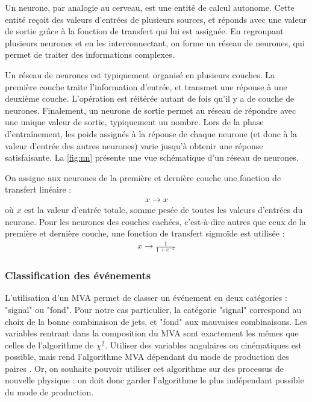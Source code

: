 Un neurone, par analogie au cerveau, est une entité de calcul autonome. Cette entité reçoit des valeurs d'entrées de plusieurs sources, et réponds avec une valeur de sortie grâce à la fonction de transfert qui lui est assignée. En regroupant plusieurs neurones et en les interconnectant, on forme un réseau de neurones, qui permet de traiter des informations complexes.

Un réseau de neurones est typiquement organisé en plusieurs couches. La première couche traite l'information d'entrée, et transmet une réponse à une deuxième couche. L'opération est réitérée autant de fois qu'il y a de couche de neurones. Finalement, un neurone de sortie permet au réseau de répondre avec une unique valeur de sortie, typiquement un nombre. Lors de la phase d'entraînement, les poids assignés à la réponse de chaque neurone (et donc à la valeur d'entrée des autres neurones) varie jusqu'à obtenir une réponse satisfaisante. La \cref{fig:nn} présente une vue schématique d'un réseau de neurones.

On assigne aux neurones de la première et dernière couche une fonction de transfert linéaire :
\begin{align*}
  x \rightarrow x
\end{align*}
où $x$ est la valeur d'entrée totale, somme pesée de toutes les valeurs d'entrées du neurone. Pour les neurones des couches cachées, c'est-à-dire autres que ceux de la première et dernière couche, une fonction de transfert sigmoïde est utilisée :
\begin{align*}
  x \rightarrow \frac{1}{1 + e^{-x}}
\end{align*}

\subsubsection{Classification des événements \ttbar}

L'utilisation d'un MVA permet de classer un événement en deux catégories : "signal" ou "fond". Pour notre cas particulier, la catégorie "signal" correspond au choix de la bonne combinaison de jets, et "fond" aux mauvaises combinaisons. Les variables rentrant dans la composition du MVA sont exactement les mêmes que celles de l'algorithme de $\chi^2$. Utiliser des variables angulaires ou cinématiques est possible, mais rend l'algorithme MVA dépendant du mode de production des paires \ttbar. Or, on souhaite pouvoir utiliser cet algorithme sur des processus de nouvelle physique : on doit donc garder l'algorithme le plus indépendant possible du mode de production.

